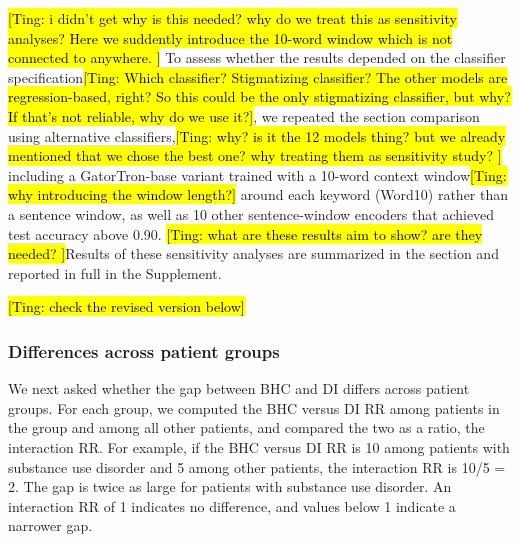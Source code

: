 \documentclass[unnumsec,webpdf,contemporary,large]{oup-authoring-template}
\newcommand{\td}[1]{\sethlcolor{pink}\hl{[Ting: #1]}}
\begin{document}

\td{i didn't get why is this needed? why do we treat this as sensitivity analyses? Here we suddently introduce the 10-word window which is not connected to anywhere. }
To assess whether the results depended on the classifier specification\td{Which classifier? Stigmatizing classifier? The other models are regression-based, right? So this could be the only stigmatizing classifier, but why? If that’s not reliable, why do we use it?}, we repeated the section comparison using alternative classifiers,\td{why? is it the 12 models thing? but we already mentioned that we chose the best one? why treating them as sensitivity study? } including a GatorTron-base variant trained with a 10-word context window\td{why introducing the window length?} around each keyword (Word10) rather than a sentence window, as well as 10 other sentence-window encoders that achieved test accuracy above 0.90. \td{what are these results aim to show? are they needed? }Results of these sensitivity analyses are summarized in the  section and reported in full in the Supplement.



\td{check the revised version below}
\subsubsection{Differences across patient groups}
We next asked whether the gap between BHC and DI differs across patient groups. For each group, we computed the BHC versus DI RR among patients in the group and among all other patients, and compared the two as a ratio, the interaction RR. For example, if the BHC versus DI RR is 10 among patients with substance use disorder and 5 among other patients, the interaction RR is 10/5 = 2. The gap is twice as large for patients with substance use disorder. An interaction RR of 1 indicates no difference, and values below 1 indicate a narrower gap.
\end{document}
